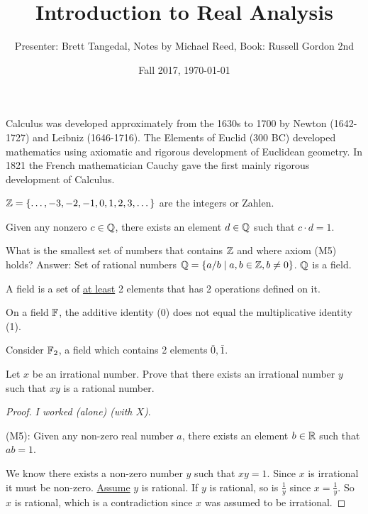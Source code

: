 \documentclass[]{article}
\author{Presenter: Brett Tangedal, Notes by Michael Reed, Book: Russell Gordon 2nd}
\title{Introduction to Real Analysis}
\date{Fall 2017, \today}
\begin{document}
\maketitle

Calculus was developed approximately from the 1630s to 1700 by Newton (1642-1727) and Leibniz (1646-1716). The Elements of Euclid (300 BC) developed mathematics using axiomatic and rigorous development of Euclidean geometry. In 1821 the French mathematician Cauchy gave the first mainly rigorous development of Calculus.
\begin{example}
	$\mathbb{Z} =\{\dots,-3,-2,-1,0,1,2,3,\dots\}$ are the integers or Zahlen.
\end{example}

\begin{proposition}
	[M5] Given any nonzero $c\in \mathbb{Q}$, there exists an element $d\in\mathbb{Q}$ such that $c\cdot d=1$.
\end{proposition}

\begin{example}
	What is the smallest set of numbers that contains $\mathbb{Z}$ and where axiom (M5) holds? Answer: Set of rational numbers $\mathbb{Q} = \{a/b\mid a,b\in\mathbb{Z},b\neq0\}$. $\mathbb{Q}$ is a field.
\end{example}

\begin{definition}
	A field is a set of \ul{at least} 2 elements that has 2 operations defined on it.
\end{definition}

On a field $\mathbb{F}$, the additive identity (0) does not equal the multiplicative identity (1).

\begin{example}
	Consider $\mathbb{F}_2$, a field which contains 2 elements $\bar 0,\bar 1$.
\end{example}

\begin{example}
	[HW Example (9) on p.9] Let $x$ be an irrational number. Prove that there exists an irrational number $y$ such that $xy$ is a rational number.
	\begin{proof}
		\textit{I worked (alone) (with $X$)}.
		
		(M5): Given any non-zero real number $a$, there exists an element $b\in\mathbb{R}$ such that $ab=1$.
		
		We know there exists a non-zero number $y$ such that $xy=1$. Since $x$ is irrational it must be non-zero. \ul{Assume} $y$ is rational. If $y$ is rational, so is $\frac{1}{y}$ since $x=\frac{1}{y}$. So $x$ is rational, which is a contradiction since $x$ was assumed to be irrational.
	\end{proof}
\end{example}
\end{document}
